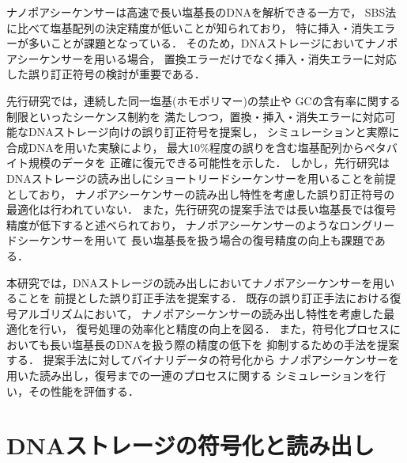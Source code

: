 \documentclass[sotsuron]{kuee}
\begin{document}
ナノポアシーケンサーは高速で長い塩基長のDNAを解析できる一方で，
SBS法に比べて塩基配列の決定精度が低いことが知られており，
特に挿入・消失エラーが多いことが課題となっている\cite{Amarasinghe2020,Dorey2024}． 
そのため，DNAストレージにおいてナノポアシーケンサーを用いる場合，
置換エラーだけでなく挿入・消失エラーに対応した誤り訂正符号の検討が重要である．

先行研究では，連続した同一塩基(ホモポリマー)の禁止や
GCの含有率に関する制限といったシーケンス制約を
満たしつつ，置換・挿入・消失エラーに対応可能なDNAストレージ向けの誤り訂正符号を提案し，
シミュレーションと実際に合成DNAを用いた実験により，
最大10\%程度の誤りを含む塩基配列からペタバイト規模のデータを
正確に復元できる可能性を示した\cite{HEDGES}．
しかし，先行研究はDNAストレージの読み出しにショートリードシーケンサーを用いることを前提としており，
ナノポアシーケンサーの読み出し特性を考慮した誤り訂正符号の最適化は行われていない．
また，先行研究の提案手法では長い塩基長では復号精度が低下すると述べられており，
ナノポアシーケンサーのようなロングリードシーケンサーを用いて
長い塩基長を扱う場合の復号精度の向上も課題である．

本研究では，DNAストレージの読み出しにおいてナノポアシーケンサーを用いることを
前提とした誤り訂正手法を提案する．
既存の誤り訂正手法における復号アルゴリズムにおいて，
ナノポアシーケンサーの読み出し特性を考慮した最適化を行い，
復号処理の効率化と精度の向上を図る．
また，符号化プロセスにおいても長い塩基長のDNAを扱う際の精度の低下を
抑制するための手法を提案する．
提案手法に対してバイナリデータの符号化から
ナノポアシーケンサーを用いた読み出し，復号までの一連のプロセスに関する
シミュレーションを行い，その性能を評価する．

\chapter{DNAストレージの符号化と読み出し}
\end{document}
